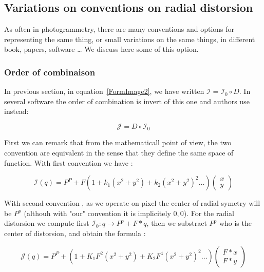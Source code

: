 
\subsection{Variations on  conventions on radial distorsion}

As often in photogrammetry, there are many conventions and options for representing the same thing,
or small variations on the same things, in different book, papers, software \dots
We discuss here some of this option.


\subsubsection{Order of combinaison}

In previous section, in equation~\ref{FormImage2}, we have written  $ \mathcal{I} = \mathcal{I}_0  \circ D \label{FormImage2}$.
In several software the order of combination is invert of this one and authors use instead:

\begin{equation}
	\mathcal{J} = D \circ  \mathcal{I}_0  
\end{equation}

First we can remark that from the mathematicall point of view, the two convention are equivalent in the sense
that they define the same space of function.  With first convention we have :

\begin{equation}
	\mathcal{I}(q) = P^P + F (1 + k_1 (x^2+y^2) +  k_2 (x^2+y^2) ^2 \dots)  \begin{pmatrix} x \\ y \end{pmatrix}
\end{equation}

With second convention , as we operate on pixel the center of radial symetry will  be $P^p$ 
(althouh with "our" convention it is implicitely $0,0$). For the radial distorsion 
we compute first  $  \mathcal{I}_0 : q \rightarrow  P^p + F*q$, then we substract 
$P^p$  who is the center of distorsion, and obtain the formula :

\begin{equation}
	\mathcal{J}(q) = P^P + (1 + K_1 F^2 (x^2+y^2) +  K_2  F^4 (x^2+y^2) ^2 \dots)  \begin{pmatrix} F*x \\ F*y \end{pmatrix}
\end{equation}

